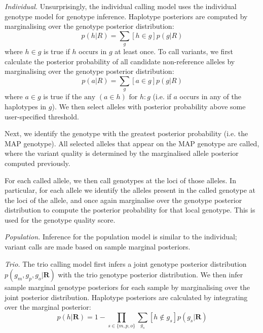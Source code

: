 \documentclass[notitlepage, twocolumn, 10pt]{article}
\begin{document}
\vspace{3mm}
\noindent\emph{Individual.} Unsurprisingly, the individual calling model uses the individual genotype model for genotype inference. Haplotype posteriors are computed by marginalising over the genotype posterior distribution:
\begin{equation*}
p(h | R) = \sum_{g} [h \in g]p(g | R)
\end{equation*}
where $h \in g$ is true if $h$ occurs in $g$ at least once. To call variants, we first calculate the posterior probability of all candidate non-reference alleles by marginalising over the genotype posterior distribution:
\begin{equation*}
p(a | R) = \sum_{g} [a \in g]p(g | R)
\end{equation*}
where $a \in g$ is true if the $\text{any }(a \in h) \text{ for } h : g$ (i.e. if $a$ occurs in any of the haplotypes in $g$). We then select alleles with posterior probability above some user-specified threshold.

Next, we identify the genotype with the greatest posterior probability (i.e. the MAP genotype). All selected alleles that appear on the MAP genotype are called, where the variant quality is determined by the marginalised allele posterior computed previously.

For each called allele, we then call genotypes at the loci of those alleles. In particular, for each allele we identify the alleles present in the called genotype at the loci of the allele, and once again marginalise over the genotype posterior distribution to compute the posterior probability for that local genotype. This is used for the genotype quality score.

\vspace{3mm}
\noindent\emph{Population.} Inference for the population model is similar to the individual; variant calls are made based on sample marginal posteriors.

\vspace{3mm}
\noindent\emph{Trio.} The trio calling model first infers a joint genotype posterior distribution $p(g_m, g_p, g_o | \boldsymbol{R})$ with the trio genotype posterior distribution. We then infer sample marginal genotype posteriors for each sample by marginalising over the joint posterior distribution. Haplotype posteriors are calculated by integrating over the marginal posterior:
\begin{equation*}
p(h | \boldsymbol{R}) = 1 - \prod_{s \in \{m, p, o\}}\sum_{g_s} [h \notin g_s]p(g_s | \boldsymbol{R})
\end{equation*}
\end{document}
